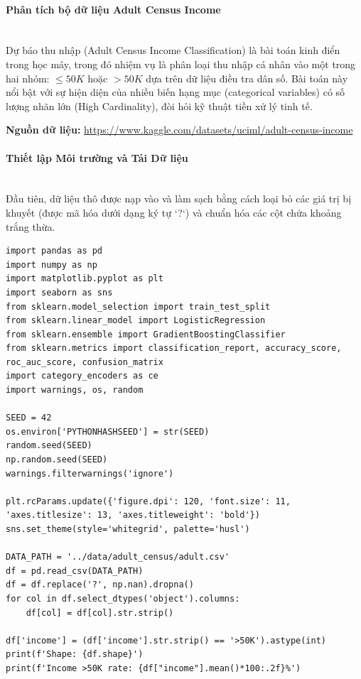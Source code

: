 \paragraph{Phân tích bộ dữ liệu Adult Census Income} \hfill \\

Dự báo thu nhập (Adult Census Income Classification) là bài toán kinh điển trong học máy, trong đó nhiệm vụ là phân loại thu nhập cá nhân vào một trong hai nhóm: $\leq50K$ hoặc $>50K$ dựa trên dữ liệu điều tra dân số. Bài toán này nổi bật với sự hiện diện của nhiều biến hạng mục (categorical variables) có số lượng nhãn lớn (High Cardinality), đòi hỏi kỹ thuật tiền xử lý tinh tế.

\begin{center}
    \textbf{Nguồn dữ liệu:} \url{https://www.kaggle.com/datasets/uciml/adult-census-income}
\end{center}

\paragraph{Thiết lập Môi trường và Tải Dữ liệu} \hfill \\

Đầu tiên, dữ liệu thô được nạp vào và làm sạch bằng cách loại bỏ các giá trị bị khuyết (được mã hóa dưới dạng ký tự `?`) và chuẩn hóa các cột chứa khoảng trắng thừa.

\begin{lstlisting}[style=pythoncode, caption={Initialize environment and load Census dataset}]
import pandas as pd
import numpy as np
import matplotlib.pyplot as plt
import seaborn as sns
from sklearn.model_selection import train_test_split
from sklearn.linear_model import LogisticRegression
from sklearn.ensemble import GradientBoostingClassifier
from sklearn.metrics import classification_report, accuracy_score, roc_auc_score, confusion_matrix
import category_encoders as ce
import warnings, os, random

SEED = 42
os.environ['PYTHONHASHSEED'] = str(SEED)
random.seed(SEED)
np.random.seed(SEED)
warnings.filterwarnings('ignore')

plt.rcParams.update({'figure.dpi': 120, 'font.size': 11, 'axes.titlesize': 13, 'axes.titleweight': 'bold'})
sns.set_theme(style='whitegrid', palette='husl')

DATA_PATH = '../data/adult_census/adult.csv'
df = pd.read_csv(DATA_PATH)
df = df.replace('?', np.nan).dropna()
for col in df.select_dtypes('object').columns:
    df[col] = df[col].str.strip()

df['income'] = (df['income'].str.strip() == '>50K').astype(int)
print(f'Shape: {df.shape}')
print(f'Income >50K rate: {df["income"].mean()*100:.2f}%')
\end{lstlisting}

